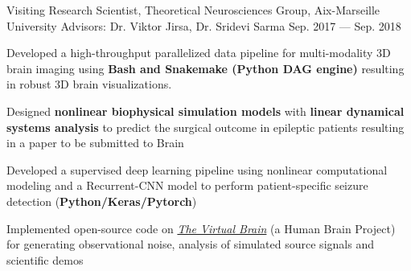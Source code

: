 \begin{cventries}
    \cvproject
        {Visiting Research Scientist, Theoretical Neurosciences Group, Aix-Marseille University \newline Advisors: Dr. Viktor Jirsa, Dr. Sridevi Sarma} %
        {Sep. 2017 --- Sep. 2018} %
        {
          \begin{cvitems} %
            \item{Developed a high-throughput parallelized data pipeline for multi-modality 3D brain imaging using \textbf{Bash and Snakemake (Python DAG engine)} resulting in robust 3D brain visualizations.}
            \item{Designed \textbf{nonlinear biophysical simulation models} with \textbf{linear dynamical systems analysis} to predict the surgical outcome in epileptic patients resulting in a paper to be submitted to Brain}
            \item{Developed a supervised deep learning pipeline using nonlinear computational modeling and a Recurrent-CNN model to perform patient-specific seizure detection (\textbf{Python/Keras/Pytorch})}
            \item{Implemented open-source code on \href{https://github.com/the-virtual-brain/tvb-library/}{\textit{The Virtual Brain}} (a Human Brain Project) for generating observational noise, analysis of simulated source signals and scientific demos}
          \end{cvitems}
        }
        
\end{cventries}


